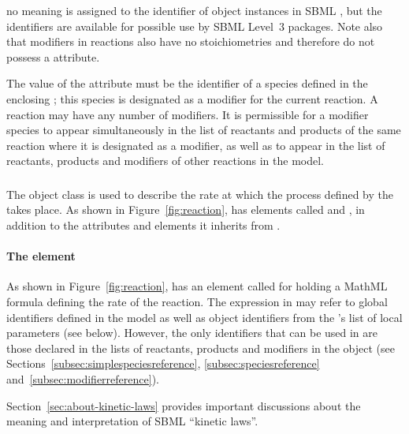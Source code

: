  no meaning is
assigned to the identifier of \ModifierSpeciesReference object
instances in SBML \thisLV, but the identifiers are available for
possible use by SBML Level~3 packages.  Note also that modifiers
in reactions also have no stoichiometries and therefore do not
possess a  attribute.

The value of the  attribute must be the identifier of a
species defined in the enclosing \Model; this species is
designated as a modifier for the current reaction.  A reaction may
have any number of modifiers.  It is permissible for a modifier
species to appear simultaneously in the list of reactants and
products of the same reaction where it is designated as a
modifier, as well as to appear in the list of reactants, products
and modifiers of other reactions in the model.


\subsubsection{}
\label{subsec:kinetic-law}
\label{subsec:listoflocalparameters}

The \KineticLaw object class is used to describe the rate at which
the process defined by the \Reaction takes place.  As shown in
Figure~\vref{fig:reaction}, \KineticLaw has elements called
 and , in addition to the
attributes and elements it inherits from \SBase.


\paragraph{The  element}

As shown in Figure~\vref{fig:reaction}, \KineticLaw has an element
called  for holding a MathML formula defining the rate
of the reaction.  The expression in  may refer to
global identifiers defined in the model as well as \LocalParameter object
identifiers from the \KineticLaw's list of local parameters (see
below).  However, the only \Species identifiers that can be used
in  are those declared in the lists of reactants,
products and modifiers in the \Reaction object (see
Sections~\ref{subsec:simplespeciesreference},
\ref{subsec:speciesreference} and~\ref{subsec:modifierreference}).

Section~\ref{sec:about-kinetic-laws} provides important
discussions about the meaning and interpretation of SBML ``kinetic
laws''.


